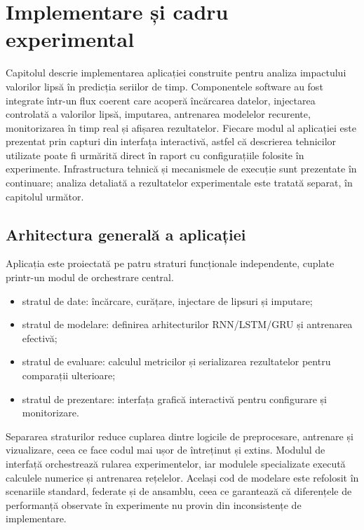 \chapter{Implementare și cadru experimental}

Capitolul descrie implementarea aplicației construite pentru analiza impactului valorilor lipsă în predicția seriilor de timp. Componentele software au fost integrate într-un flux coerent care acoperă încărcarea datelor, injectarea controlată a valorilor lipsă, imputarea, antrenarea modelelor recurente, monitorizarea în timp real și afișarea rezultatelor. Fiecare modul al aplicației este prezentat prin capturi din interfața interactivă, astfel că descrierea tehnicilor utilizate poate fi urmărită direct în raport cu configurațiile folosite în experimente. Infrastructura tehnică și mecanismele de execuție sunt prezentate în continuare; analiza detaliată a rezultatelor experimentale este tratată separat, în capitolul următor.

\section{Arhitectura generală a aplicației}

Aplicația este proiectată pe patru straturi funcționale independente, cuplate printr-un modul de orchestrare central.

\begin{itemize}
    \item stratul de date: încărcare, curățare, injectare de lipsuri și imputare;
    \item stratul de modelare: definirea arhitecturilor RNN/LSTM/GRU și antrenarea efectivă;
    \item stratul de evaluare: calculul metricilor și serializarea rezultatelor pentru comparații ulterioare;
    \item stratul de prezentare: interfața grafică interactivă pentru configurare și monitorizare.
\end{itemize}

Separarea straturilor reduce cuplarea dintre logicile de preprocesare, antrenare și vizualizare, ceea ce face codul mai ușor de întreținut și extins. Modulul de interfață orchestrează rularea experimentelor, iar modulele specializate execută calculele numerice și antrenarea rețelelor. Același cod de modelare este refolosit în scenariile standard, federate și de ansamblu, ceea ce garantează că diferențele de performanță observate în experimente nu provin din inconsistențe de implementare.

